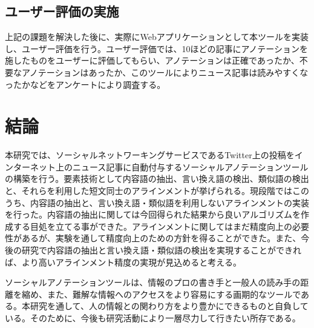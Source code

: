 \documentclass[12pt]{jarticle}
\begin{document}
\subsection{ユーザー評価の実施}
上記の課題を解決した後に、実際にWebアプリケーションとして本ツールを実装し、ユーザー評価を行う。ユーザー評価では、10ほどの記事にアノテーションを施したものをユーザーに評価してもらい、アノテーションは正確であったか、不要なアノテーションはあったか、このツールによりニュース記事は読みやすくなったかなどをアンケートにより調査する。

\section{結論}
本研究では、ソーシャルネットワーキングサービスであるTwitter上の投稿をインターネット上のニュース記事に自動付与するソーシャルアノテーションツールの構築を行う。要素技術として内容語の抽出、言い換え語の検出、類似語の検出と、それらを利用した短文同士のアラインメントが挙げられる。現段階ではこのうち、内容語の抽出と、言い換え語・類似語を利用しないアラインメントの実装を行った。内容語の抽出に関しては今回得られた結果から良いアルゴリズムを作成する目処を立てる事ができた。アラインメントに関してはまだ精度向上の必要性があるが、実験を通して精度向上のための方針を得ることができた。また、今後の研究で内容語の抽出と言い換え語・類似語の検出を実現することができれば、より高いアラインメント精度の実現が見込めると考える。

ソーシャルアノテーションツールは、情報のプロの書き手と一般人の読み手の距離を縮め、また、難解な情報へのアクセスをより容易にする画期的なツールである。本研究を通して、人の情報との関わり方をより豊かにできるものと自負している。そのために、今後も研究活動により一層尽力して行きたい所存である。
\end{document}
